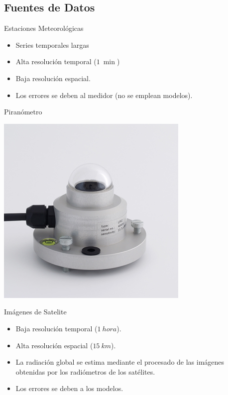 \documentclass[xcolor={usenames,svgnames,dvipsnames}]{beamer}
\begin{document}
\subsection{Fuentes de Datos}
\label{sec:org4d8083f}
\begin{frame}[label={sec:org7270c1b}]{Estaciones Meteorológicas}
\begin{itemize}
\item Series temporales largas
\item Alta resolución temporal (\(\SI{1}{\min}\))
\item Baja resolución espacial.
\item Los errores se deben al medidor (no se emplean modelos).
\end{itemize}

\begin{block}{Piranómetro}
\begin{center}
\begin{center}
\includegraphics[height=0.5\textheight]{../figs/piranometro.jpg}
\end{center}
\end{center}
\end{block}
\end{frame}


\begin{frame}[label={sec:org93240b2}]{Imágenes de Satelite}
\begin{itemize}
\item Baja resolución temporal (\(\SI{1}{hora}\)).

\item Alta resolución espacial (\(\SI{15}{km}\)).

\item La radiación global se estima mediante el procesado de las imágenes obtenidas por los radiómetros de los satélites.

\item Los errores se deben a los modelos.
\end{itemize}
\end{frame}
\end{document}
